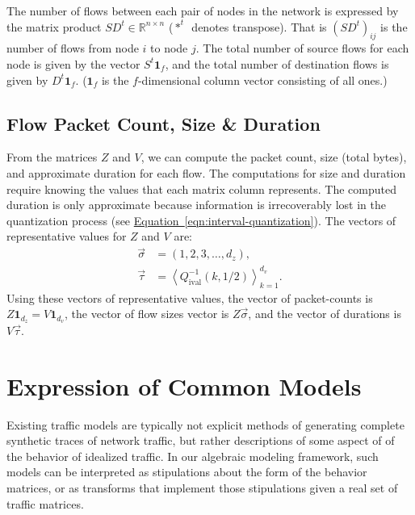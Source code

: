 \documentclass[conference]{IEEEtran}
\newcommand{\Section}[1]{\hyperref[sec:#1]{Section~\ref*{sec:#1}}}
\newcommand{\Equation}[1]{\hyperref[eqn:#1]{Equation~\ref*{eqn:#1}}}
\newcommand{\R}{\mathbb{R}}
\newcommand{\Di}{Q^{-1}_{\text{ival}}}
\newcommand{\ones}[1]{\mathbf{1}_{#1}}
\newcommand{\seq}[1]{\left<#1\right>}
\newcommand{\fracx}[2]{#1/#2}
\begin{document}
The number of flows between each pair of nodes in the network is expressed by the matrix product $SD^t\in\R^{n \times n}$ ($*^t$~denotes transpose). That is $(SD^t)_{ij}$ is the number of flows from node $i$ to node $j$. The total number of source flows for each node is given by the vector $S^t\ones{f}$, and the total number of destination flows is given by $D^t\ones{f}$. ($\ones{f}$ is the $f$-dimensional column vector consisting of all ones.)

\subsection{Flow Packet Count, Size \& Duration}
\label{sec:flow-totals}

From the matrices $Z$ and $V$, we can compute the packet count, size (total bytes), and approximate duration for each flow. The computations for size and duration require knowing the values that each matrix column represents. The computed duration is only approximate because information is irrecoverably lost in the quantization process (see \Equation{interval-quantization}). The vectors of representative values for $Z$ and $V$ are:
\begin{align}
\vec{\sigma}&=(1,2,3,\dots,d_z),\\
\vec{\tau}&=\seq{\Di\left(k,\fracx{1}{2}\right)}_{k=1}^{d_v}.
\end{align}
Using these vectors of representative values, the vector of packet-counts is $Z\ones{d_z}=V\ones{d_v}$, the vector of flow sizes vector is $Z\vec{\sigma}$, and the vector of durations is $V\vec{\tau}$.

\section{Expression of Common Models}

Existing traffic models are typically not explicit methods of generating complete synthetic traces of network traffic, but rather descriptions of some aspect of of the behavior of idealized traffic. In our algebraic modeling framework, such models can be interpreted as stipulations about the form of the behavior matrices, or as transforms that implement those stipulations given a real set of traffic matrices.

\end{document}
